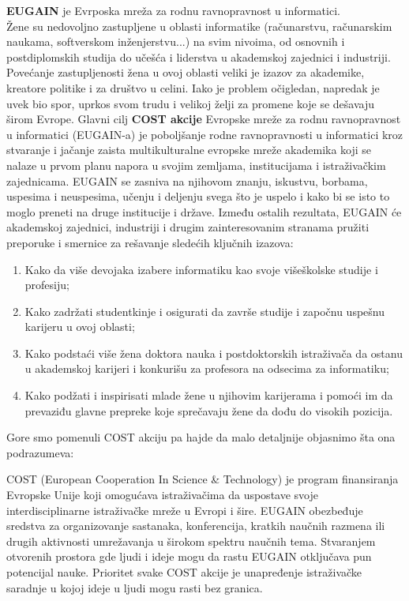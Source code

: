 \documentclass[a4paper]{article}
\begin{document}
\textbf{EUGAIN} je Evrposka mreža za rodnu ravnopravnost u informatici. \\

\ident Žene su nedovoljno zastupljene u oblasti informatike (računarstvu, računarskim naukama, softverskom inženjerstvu...) na svim nivoima, od osnovnih i postdiplomskih studija do učešća i liderstva u akademskoj zajednici i industriji. Povećanje zastupljenosti žena u ovoj oblasti veliki je izazov za akademike, kreatore politike i za društvo u celini. Iako je problem očigledan, napredak je uvek bio spor, uprkos svom trudu i velikoj želji za promene koje se dešavaju širom Evrope. Glavni cilj \textbf{COST akcije} Evropske mreže za rodnu ravnopravnost u informatici (EUGAIN-a) je poboljšanje rodne ravnopravnosti u informatici kroz stvaranje i jačanje zaista multikulturalne evropske mreže akademika koji se nalaze u prvom planu napora u svojim zemljama, institucijama i istraživačkim zajednicama. EUGAIN se zasniva na njihovom znanju, iskustvu, borbama, uspesima i neuspesima, učenju i deljenju svega što je uspelo i kako bi se isto to moglo preneti na druge institucije i države. 
\ident Između ostalih rezultata, EUGAIN će akademskoj zajednici, industriji i drugim zainteresovanim stranama pružiti preporuke i smernice za rešavanje sledećih ključnih izazova:

\begin{enumerate}
\item Kako da više devojaka izabere informatiku kao svoje višeškolske studije i profesiju;

\item Kako zadržati studentkinje i osigurati da završe studije i započnu uspešnu karijeru u ovoj oblasti;

\item Kako podstaći više žena doktora nauka i postdoktorskih istraživača da ostanu u akademskoj karijeri i konkurišu za profesora na odsecima za informatiku;

\item Kako podžati i inspirisati mlade žene u njihovim karijerama i pomoći im da prevaziđu glavne prepreke koje sprečavaju žene da dođu do visokih pozicija.
\end{enumerate}
\ident Gore smo pomenuli COST akciju pa hajde da malo detaljnije objasnimo šta ona podrazumeva:

\ident COST (European Cooperation In Science & Technology) je program finansiranja Evropske Unije koji omogućava istraživačima da uspostave svoje interdisciplinarne istraživačke mreže u Evropi i šire. EUGAIN obezbeđuje sredstva za organizovanje sastanaka, konferencija, kratkih naučnih razmena ili drugih aktivnosti umrežavanja u širokom spektru naučnih tema. Stvaranjem otvorenih prostora gde ljudi i ideje mogu da rastu EUGAIN otključava pun potencijal nauke.
Prioritet svake COST akcije je unapređenje istraživačke saradnje u kojoj ideje u ljudi mogu rasti bez granica. 
\end{document}
